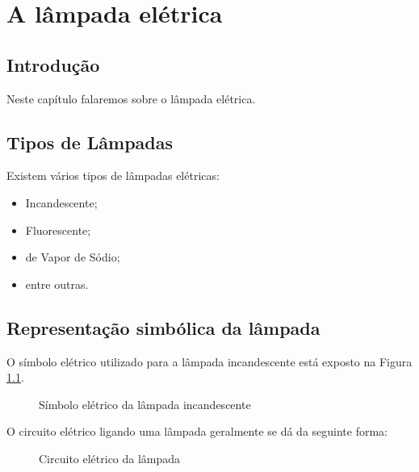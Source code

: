 \chapter{A lâmpada elétrica}
\label{chap:alampada}

\section{Introdução}

Neste capítulo falaremos sobre o lâmpada elétrica.

\section{Tipos de Lâmpadas}

Existem vários tipos de lâmpadas elétricas:
\begin{itemize}
\item Incandescente;
\item Fluorescente;
\item de Vapor de Sódio;
\item entre outras. %
\end{itemize}

\section{Representação simbólica da lâmpada}

O símbolo elétrico utilizado para a lâmpada incandescente está
exposto na Figura \ref{fig:simbolo_lampada}.

\begin{figure}[!htb]
\centering
{}
\caption{Símbolo elétrico da lâmpada incandescente}
\label{fig:simbolo_lampada}
\end{figure}

O circuito elétrico ligando uma lâmpada geralmente se dá da
seguinte forma:

\begin{figure}[!htb]
\centering
{}
\caption{Circuito elétrico da lâmpada}
\label{fig:circuito_lampada}
\end{figure}


